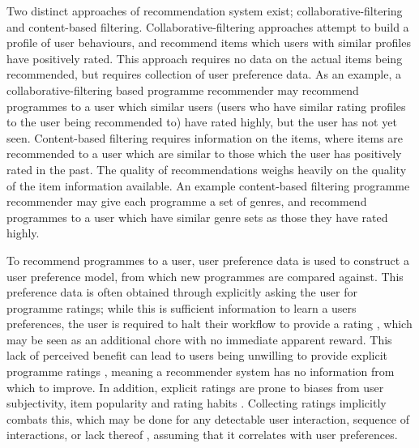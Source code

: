 	Two distinct approaches of recommendation system exist; collaborative-filtering and content-based filtering. Collaborative-filtering approaches attempt to build a profile of user behaviours, and recommend items which users with similar profiles have positively rated. This approach requires no data on the actual items being recommended, but requires collection of user preference data. As an example, a collaborative-filtering based programme recommender may recommend programmes to a user which similar users (users who have similar rating profiles to the user being recommended to) have rated highly, but the user has not yet seen. Content-based filtering requires information on the items, where items are recommended to a user which are similar to those which the user has positively rated in the past. The quality of recommendations weighs heavily on the quality of the item information available. An example content-based filtering programme recommender may give each programme a set of genres, and recommend programmes to a user which have similar genre sets as those they have rated highly.

	To recommend programmes to a user, user preference data is used to construct a user preference model, from which new programmes are compared against. This preference data is often obtained through explicitly asking the user for programme ratings; while this is sufficient information to learn a users preferences, the user is required to halt their workflow to provide a rating \citep{implicit_indicators}, which may be seen as an additional chore with no immediate apparent reward. This lack of perceived benefit can lead to users being unwilling to provide explicit programme ratings \citep{8_challenges}, meaning a recommender system has no information from which to improve. In addition, explicit ratings are prone to biases from user subjectivity, item popularity and rating habits \citep[p.~304]{recommender-systems-handbook}. Collecting ratings implicitly combats this, which may be done for any detectable user interaction, sequence of interactions, or lack thereof \citep{implicit_indicators}, assuming that it correlates with user preferences.

